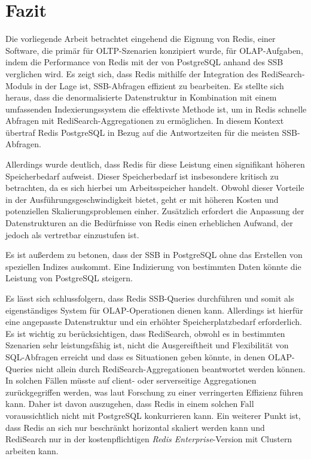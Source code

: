 \chapter{Fazit}
Die vorliegende Arbeit betrachtet eingehend die Eignung von Redis, einer Software, die primär für OLTP-Szenarien konzipiert wurde, für OLAP-Aufgaben, indem die Performance von Redis mit der von PostgreSQL anhand des \acf{SSB} verglichen wird. Es zeigt sich, dass Redis mithilfe der Integration des RediSearch-Moduls in der Lage ist, SSB-Abfragen effizient zu bearbeiten. Es stellte sich heraus, dass die denormalisierte Datenstruktur in Kombination mit einem umfassenden Indexierungssystem die effektivste Methode ist, um in Redis schnelle Abfragen mit RediSearch-Aggregationen zu ermöglichen. In diesem Kontext übertraf Redis PostgreSQL in Bezug auf die Antwortzeiten für die meisten SSB-Abfragen.

Allerdings wurde deutlich, dass Redis für diese Leistung einen signifikant höheren Speicherbedarf aufweist. Dieser Speicherbedarf ist insbesondere kritisch zu betrachten, da es sich hierbei um Arbeitsspeicher handelt. Obwohl dieser Vorteile in der Ausführungsgeschwindigkeit bietet, geht er mit höheren Kosten und potenziellen Skalierungsproblemen einher. Zusätzlich erfordert die Anpassung der Datenstrukturen an die Bedürfnisse von Redis einen erheblichen Aufwand, der jedoch als vertretbar einzustufen ist.

Es ist außerdem zu betonen, dass der \acf{SSB} in PostgreSQL ohne das Erstellen von speziellen Indizes auskommt. Eine Indizierung von bestimmten Daten könnte die Leistung von PostgreSQL steigern.

Es lässt sich schlussfolgern, dass Redis SSB-Queries durchführen und somit als eigenständiges System für OLAP-Operationen dienen kann. Allerdings ist hierfür eine angepasste Datenstruktur und ein erhöhter Speicherplatzbedarf erforderlich. Es ist wichtig zu berücksichtigen, dass RediSearch, obwohl es in bestimmten Szenarien sehr leistungsfähig ist, nicht die Ausgereiftheit und Flexibilität von SQL-Abfragen erreicht und dass es Situationen geben könnte, in denen OLAP-Queries nicht allein durch RediSearch-Aggregationen beantwortet werden können. In solchen Fällen müsste auf client- oder serverseitige Aggregationen zurückgegriffen werden, was laut Forschung zu einer verringerten Effizienz führen kann. Daher ist davon auszugehen, dass Redis in einem solchen Fall voraussichtlich nicht mit PostgreSQL konkurrieren kann. Ein weiterer Punkt ist, dass Redis an sich nur beschränkt horizontal skaliert werden kann und RediSearch nur in der kostenpflichtigen \emph{Redis Enterprise}-Version mit Clustern arbeiten kann.


